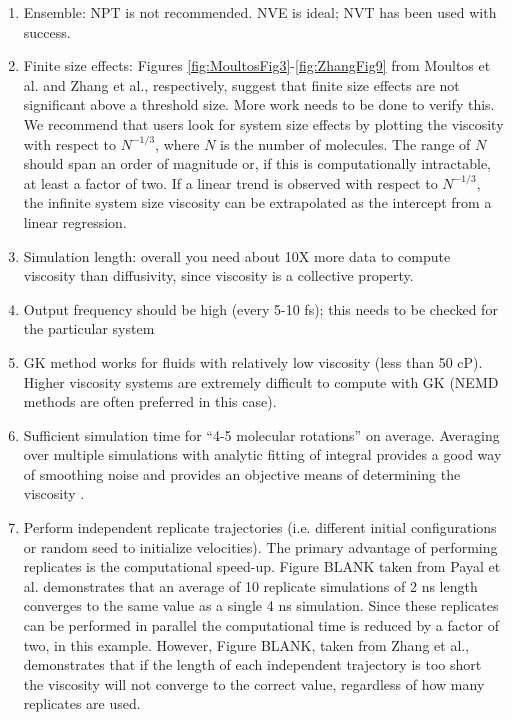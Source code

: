 \documentclass[9pt]{livecoms}
\begin{document}
\begin{enumerate}
	\item Ensemble: NPT is not recommended. NVE is ideal; NVT has been used with success.
	\item Finite size effects: Figures \ref{fig:MoultosFig3}-\ref{fig:ZhangFig9} from Moultos et al. and Zhang et al., respectively, suggest that finite size effects are not significant above a threshold size. More work needs to be done to verify this. We recommend that users look for system size effects by plotting the viscosity with respect to $N^{-1/3}$, where $N$ is the number of molecules. The range of $N$ should span an order of magnitude or, if this is computationally intractable, at least a factor of two. If a linear trend is observed with respect to $N^{-1/3}$, the infinite system size viscosity can be extrapolated as the intercept from a linear regression.
	\item Simulation length: overall you need about 10X more data to compute viscosity than diffusivity, since viscosity is a collective property.
	\item Output frequency should be high (every 5-10 fs); this needs to be checked for the particular system 
	\item GK method works for fluids with relatively low viscosity (less than 50 cP). Higher viscosity systems are extremely difficult to compute with GK (NEMD methods are often preferred in this case).
	\item Sufficient simulation time for “4-5 molecular rotations” on average. Averaging over multiple simulations with analytic fitting of integral provides a good way of smoothing noise and provides an objective means of determining the viscosity \cite{Zhang2015}.
	\item Perform independent replicate trajectories (i.e. different initial configurations or random seed to initialize velocities). The primary advantage of performing replicates is the computational speed-up. Figure BLANK taken from Payal et al. \cite{Payal2012} demonstrates that an average of 10 replicate simulations of 2 ns length converges to the same value as a single 4 ns simulation. Since these replicates can be performed in parallel the computational time is reduced by a factor of two, in this example. However, Figure BLANK, taken from Zhang et al., demonstrates that if the length of each independent trajectory is too short the viscosity will not converge to the correct value, regardless of how many replicates are used. 

\end{enumerate}
\end{document}
